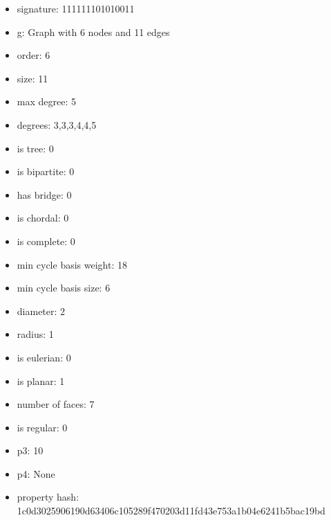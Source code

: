 \begin{itemize}
\item signature: 111111101010011
\item g: Graph with 6 nodes and 11 edges
\item order: 6
\item size: 11
\item max degree: 5
\item degrees: 3,3,3,4,4,5
\item is tree: 0
\item is bipartite: 0
\item has bridge: 0
\item is chordal: 0
\item is complete: 0
\item min cycle basis weight: 18
\item min cycle basis size: 6
\item diameter: 2
\item radius: 1
\item is eulerian: 0
\item is planar: 1
\item number of faces: 7
\item is regular: 0
\item p3: 10
\item p4: None
\item property hash: 1c0d3025906190d63406c105289f470203d11fd43e753a1b04e6241b5bac19bd
\end{itemize}
\newpage

